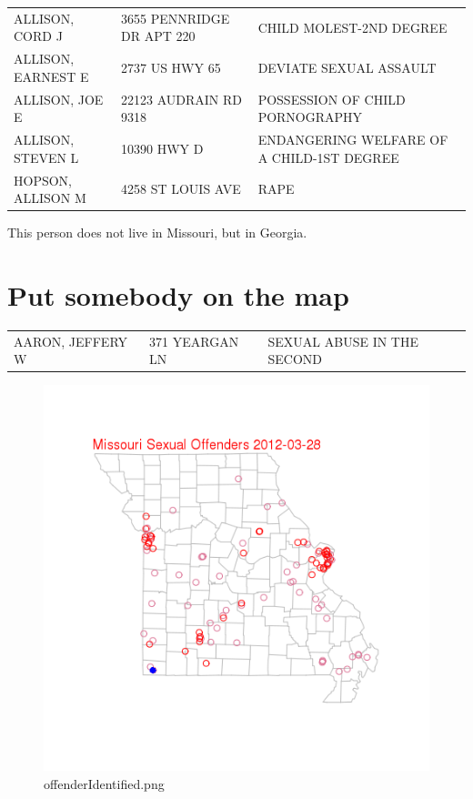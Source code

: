 \documentclass[a4paper]{article}
\begin{document}
\begin{center}
\begin{tabular}{lll}
 ALLISON, CORD J     &  3655 PENNRIDGE DR APT 220  &  CHILD MOLEST-2ND DEGREE                    \\
 ALLISON, EARNEST E  &  2737 US HWY 65             &  DEVIATE SEXUAL ASSAULT                     \\
 ALLISON, JOE E      &  22123 AUDRAIN RD 9318      &  POSSESSION OF CHILD PORNOGRAPHY            \\
 ALLISON, STEVEN L   &  10390 HWY D                &  ENDANGERING WELFARE OF A CHILD-1ST DEGREE  \\
 HOPSON, ALLISON M   &  4258 ST LOUIS AVE          &  RAPE                                       \\
\end{tabular}
\end{center}



This person does not live in Missouri, but in Georgia.
\section{Put somebody on the map}
\label{sec-8}




\begin{center}
\begin{tabular}{lll}
 AARON, JEFFERY W  &  371 YEARGAN LN  &  SEXUAL ABUSE IN THE SECOND  \\
\end{tabular}
\end{center}




\begin{figure}[!h]
\centering
\includegraphics[width=\textwidth]{offenderIdentified.png}
\caption{offenderIdentified.png}
\label{fig:offenderIdentified.png}
\end{figure}
\clearpage
\end{document}
